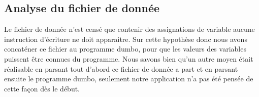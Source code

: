 \documentclass[10pt,a4paper]{article}
\begin{document}
\subsection{Analyse du fichier de donnée}
Le fichier de donnée n'est censé que contenir des assignations de variable aucune instruction d'écriture ne doit apparaitre. Sur cette hypothèse donc nous avons concaténer ce fichier au programme dumbo, pour que les valeurs des variables puissent être connues du programme. Nous savons bien qu'un autre moyen était réalisable en parsant tout d'abord ce fichier de donnée a part et en parsant ensuite le programme dumbo, seulement notre application n'a pas été pensée de cette façon dès le début.
\end{document}

